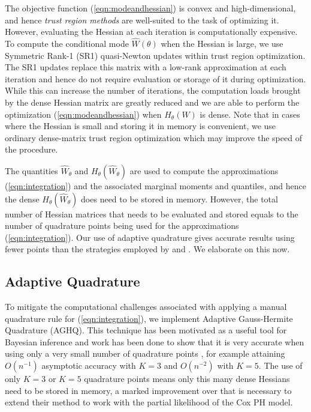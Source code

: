 \documentclass[ba]{imsart}
\begin{document}
The objective function (\ref{eqn:modeandhessian}) is convex and high-dimensional, and hence \emph{trust region methods} \citep{trustoptim} are well-suited to the task of optimizing it. However, evaluating the Hessian at each iteration is computationally expensive. To compute the conditional mode $\hat{W}(\theta)$ when the Hessian is large, we use Symmetric Rank-1 (SR1) quasi-Newton updates within trust region optimization. The SR1 updates replace this matrix with a low-rank approximation at each iteration and hence do not require evaluation or storage of it during optimization. While this can increase the number of iterations, the computation loads brought by the dense Hessian matrix are greatly reduced and we are able to perform the optimization (\ref{eqn:modeandhessian}) when $H_{\theta}(W)$ is dense. Note that in cases where the Hessian is small and storing it in memory is convenient, we use ordinary dense-matrix trust region optimization \citep{trust} which may improve the speed of the procedure.

The quantities $\widehat{W}_{\theta}$ and $H_{\theta}(\widehat{W}_{\theta})$ are used to compute the approximations (\ref{eqn:integration}) and the associated marginal moments and quantiles, and hence the dense $H_{\theta}(\widehat{W}_{\theta})$ does need to be stored in memory. However, the total number of Hessian matrices that needs to be evaluated and stored equals to the number of quadrature points being used for the approximations (\ref{eqn:integration}). Our use of adaptive quadrature gives accurate results using fewer points than the strategies employed by \cite{casecross} and \cite{inlacoxph}. We elaborate on this now.

\subsection{Adaptive Quadrature}

To mitigate the computational challenges associated with applying a manual quadrature rule for (\ref{eqn:integration}), we implement Adaptive Gauss-Hermite Quadrature (AGHQ). This technique has been motivated as a useful tool for Bayesian inference \citep{nayloradaptive} and work has been done to show that it is very accurate when using only a very small number of quadrature points \citep{adaptive_GH_1994,adaptive_GH_2020}, for example attaining $O(n^{-1})$ asymptotic accuracy with $K = 3$ and $O(n^{-2})$ with $K = 5$. The use of only $K = 3$ or $K = 5$ quadrature points means only this many dense Hessians need to be stored in memory, a marked improvement over \cite{casecross} that is necessary to extend their method to work with the partial likelihood of the Cox PH model.
\end{document}
